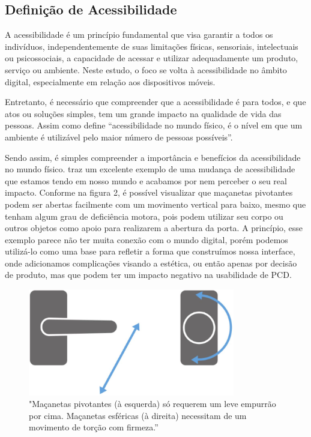 \subsection{Definição de Acessibilidade}

A acessibilidade é um princípio fundamental que visa garantir a todos os indivíduos, independentemente de suas limitações físicas, sensoriais, intelectuais ou psicossociais, a capacidade de acessar e utilizar adequadamente um produto, serviço ou ambiente. Neste estudo, o foco se volta à acessibilidade no âmbito digital, especialmente em relação aos dispositivos móveis.

Entretanto, é necessário que compreender que a acessibilidade é para todos, e que atos ou soluções simples, tem um grande impacto na qualidade de vida das pessoas. Assim como define \cite{kalbag2017} “acessibilidade no mundo físico, é o nível em que um ambiente é utilizável pelo maior número de pessoas possíveis”.

Sendo assim, é simples compreender a importância e benefícios da acessibilidade no mundo físico. \cite{kalbag2017} traz um excelente exemplo de uma mudança de acessibilidade que estamos tendo em nosso mundo e acabamos por nem perceber o seu real impacto. Conforme na figura 2, é possível visualizar que maçanetas pivotantes podem ser abertas facilmente com um movimento vertical para baixo, mesmo que tenham algum grau de deficiência motora, pois podem utilizar seu corpo ou outros objetos como apoio para realizarem a abertura da porta. A princípio, esse exemplo parece não ter muita conexão com o mundo digital, porém podemos utilizá-lo como uma base para refletir a forma que construímos nossa interface, onde adicionamos complicações visando a estética, ou então apenas por decisão de produto, mas que podem ter um impacto negativo na usabilidade de PCD.

\begin{figure}[!h]
	\centering
	\caption{"Maçanetas pivotantes (à esquerda) só requerem um leve empurrão por cima. Maçanetas esféricas (à direita) necessitam de um movimento de torção com firmeza.”}
	\includegraphics[width=256pt]{Assets/Macanetas pivotantes.png}
\end{figure}

